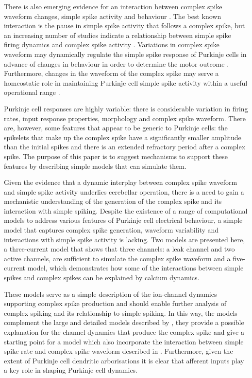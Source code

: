 \documentclass[utf8]{frontiersSCNS} %
\begin{document}
There is also emerging evidence for an interaction between complex
spike waveform changes, simple spike activity and behaviour
\cite{YangLispberger2014,StrengEtAl2017}. The best known interaction
is the pause in simple spike activity that follows a complex spike, but
an increasing number of studies indicate a relationship between simple
spike firing dynamics and complex spike activity
\cite{Mano1970,Gilbert1976,CampbellHesslow1986,HashimotoKano1998,ServaisEtAl2004,MarutaEtAl2007,WarnaarEtAl2015,BurroughsEtAl2016}.
Variations in complex spike waveform may dynamically regulate the
simple spike response of Purkinje cells in advance of changes in
behaviour in order to determine the motor outcome
\cite{StrengEtAl2017}. Furthermore, changes in the waveform of the
complex spike may serve a homeostatic role in maintaining Purkinje
cell simple spike activity within a useful operational range
\cite{BurroughsEtAl2016}.

Purkinje cell responses are highly variable: there is considerable variation in firing rates, input response properties, morphology and complex spike waveform. There are, however, some features that appear to be generic to Purkinje cells: the spikelets that make up the complex spike have a significantly smaller amplitude than the initial spikes and there is an extended refractory period after a complex spike. The purpose of this paper is to suggest mechanisms to support these features by describing simple models that can simulate them.

Given the evidence that a dynamic interplay between complex spike
waveform and simple spike activity underlies cerebellar operation, there is a need to gain a mechanistic understanding of the generation of the complex spike and its interaction with simple spiking. Despite the existence of a range of computational models to address various features of Purkinje cell electrical behaviour, a simple model that captures complex spike generation, waveform variability and interactions with simple spike activity is lacking. Two models are presented here, a three-current model that shows that three channels: a leak channel and two active channels, are sufficient to simulate the complex spike waveform and a five-current model, which demonstrates how some of the interactions between simple spikes and complex spikes can be explained by calcium dynamics. 

These models serve as a simple description of the ion-channel dynamics
supporting complex spike production and should enable further analysis
of complex spiking and its relationship to simple spiking. In this
way, the models complement the large and detailed models described
by \cite{VeysEtAl2013,ZangEtAl2018}, they provide a possible
explanation for the channel dynamics that produce the complex spike
and give a starting point for a model which also incorporate the
interaction between simple spike rate and complex spike waveform
described in \cite{BurroughsEtAl2016}. Furthermore, given the extent
of Purkinje cell dendritic arborisations it is clear that afferent
inputs play a key role in shaping Purkinje cell dynamics.
\end{document}
